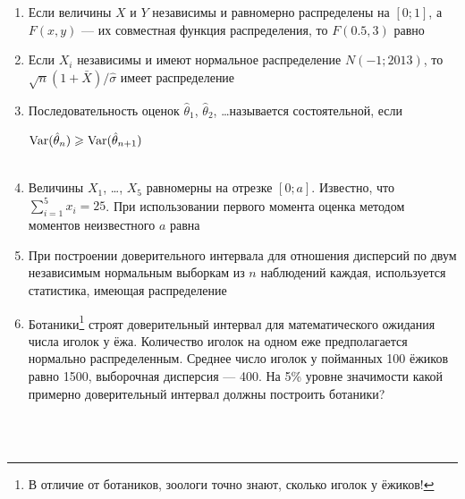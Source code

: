 \documentclass[12pt, a4paper]{article}\usepackage[]{graphicx}\usepackage[]{color}
\begin{document}
\begin{enumerate}
					\item Если величины $X$ и $Y$ независимы и равномерно распределены на $[0;1]$, а $F(x,y)$ — их совместная функция  распределения, то $F(0.5,3)$ равно


					\item Если $X_i$ независимы и имеют нормальное распределение $N(-1;2013)$, то $\sqrt{n}(1+\bar{X})/\hat{\sigma}$ имеет распределение


					\item Последовательность оценок $\hat{\theta}_1$, $\hat{\theta}_2$, \ldots называется состоятельной, если

					{$\operatorname{Var}(\hat{\theta}_n)\geqslant \operatorname{Var}(\hat{\theta}_{n+1})$} \\ \\

					\item Величины $X_1$, \ldots, $X_5$ равномерны на отрезке $[0;a]$. Известно, что $\sum_{i=1}^5 x_i=25$. При использовании первого момента оценка методом моментов неизвестного $a$ равна


					\item При построении доверительного интервала для отношения дисперсий по двум независимым нормальным выборкам из $n$ наблюдений каждая, используется статистика, имеющая распределение


					\item Ботаники\footnote{В отличие от ботаников, зоологи точно знают, сколько иголок у ёжиков!} строят доверительный интервал для математического ожидания числа иголок у ёжа. Количество иголок на одном еже предполагается нормально распределенным. Среднее число иголок у пойманных 100 ёжиков равно 1500, выборочная дисперсия — 400. На 5\% уровне значимости какой примерно доверительный интервал должны построить ботаники?


					\\ \\


\end{enumerate}
\end{document}
